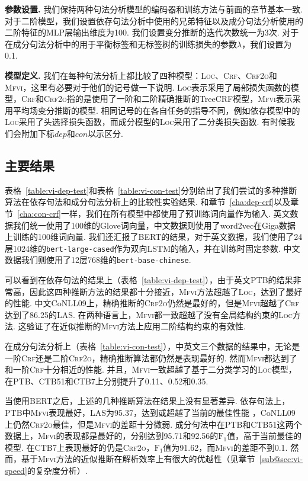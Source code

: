 \noindent\textbf{参数设置.}
我们保持两种句法分析模型的编码器和训练方法与前面的章节基本一致.
对于二阶模型，我们设置依存句法分析中使用的兄弟特征以及成分句法分析使用的二阶特征的MLP层输出维度为100.
我们设置变分推断的迭代次数统一为3次.
对于在成分句法分析中的用于平衡标签和无标签树的训练损失的参数$\lambda$，我们设置为0.1.

\noindent\textbf{模型定义.}
我们在每种句法分析上都比较了四种模型：\textsc{Loc}、\textsc{Crf}、\textsc{Crf2o}和\textsc{Mfvi}，这里有必要对于他们的记号做一下说明.
\textsc{Loc}表示采用了局部损失函数的模型，\textsc{Crf}和\textsc{Crf2o}指的是使用了一阶和二阶精确推断的TreeCRF模型，\textsc{Mfvi}表示采用平均场变分推断的模型.
相同记号的在各自任务的指导不同，例如依存模型中的\textsc{Loc}采用了头选择损失函数，而成分模型的\textsc{Loc}采用了二分类损失函数.
有时候我们会附加下标$dep$和$con$以示区分.



\subsection{主要结果}
表格~\ref{table:vi-dep-test}和表格~\ref{table:vi-con-test}分别给出了我们尝试的多种推断算法在依存句法和成分句法分析上的比较性实验结果.
和章节~\ref{cha:dep-crf}以及章节~\ref{cha:con-crf}一样，我们在所有模型中都使用了预训练词向量作为输入.
英文数据我们统一使用了100维的Glove词向量，中文数据则使用了word2vec在Giga数据上训练的100维词向量.
我们还汇报了BERT的结果，对于英文数据，我们使用了24层1024维的\texttt{bert-large-cased}作为双向LSTM的输入，并在训练时固定参数.
中文数据我们则使用了12层768维的\texttt{bert-base-chinese}.

可以看到在依存句法的结果上（表格~\ref{table:vi-dep-test}），由于英文PTB的结果非常高，因此这四种推断方法的结果都十分接近，\textsc{Mfvi}方法超越了\textsc{Loc}，达到了最好的性能.
中文CoNLL09上，精确推断的\textsc{Crf2o}仍然是最好的，但是\textsc{Mfvi}超越了\textsc{Crf}达到了86.25的LAS.
在两种语言上，\textsc{Mfvi}都一致超越了没有全局结构约束的\textsc{Loc}方法.
这验证了在近似推断的\textsc{Mfvi}方法上应用二阶结构约束的有效性.

在成分句法分析上（表格~\ref{table:vi-con-test}），中英文三个数据的结果中，无论是一阶\textsc{Crf}还是二阶\textsc{Crf2o}，精确推断算法都仍然是表现最好的.
然而\textsc{Mfvi}都达到了和一阶\textsc{Crf}十分相近的性能.
并且，\textsc{Mfvi}一致超越了基于二分类学习的\textsc{Loc}模型，在PTB、CTB51和CTB7上分别提升了0.11、0.52和0.35.

当使用BERT之后，上述的几种推断算法在结果上没有显著差异.
依存句法上，PTB中\textsc{Mfvi}表现最好，LAS为95.37，达到或超越了当前的最佳性能 \citep{zhou-zhao-2019-head,wang-tu-2020-second}，CoNLL09上仍然\textsc{Crf2o}最佳，但是\textsc{Mfvi}的差距十分微弱.
成分句法中在PTB和CTB51这两个数据上，\textsc{Mfvi}的表现都是最好的，分别达到95.71和92.56的$\mathrm{F}_1$值，高于当前最佳的模型\citep{kitaev-etal-2019-multilingual}.
在CTB7上表现最好的仍是\textsc{Crf2o}，$\mathrm{F}_1$值为91.62，而\textsc{Mfvi}的差距不到0.1.
然而，基于\textsc{Mfvi}方法的近似推断在解析效率上有很大的优越性（见章节~\ref{sub@sec:vi-speed}的复杂度分析）.

